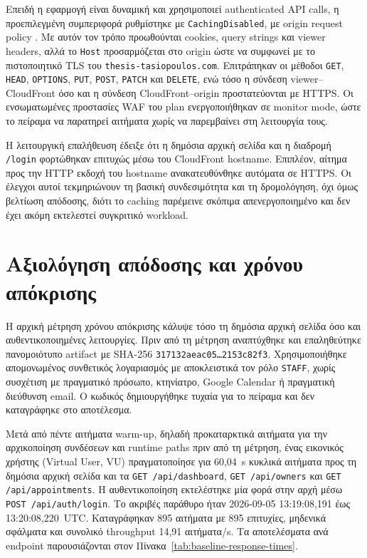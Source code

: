 Επειδή η εφαρμογή είναι δυναμική και χρησιμοποιεί authenticated API calls,
η προεπιλεγμένη συμπεριφορά ρυθμίστηκε με \texttt{CachingDisabled}, με
origin request policy . Με αυτόν τον τρόπο
προωθούνται cookies, query strings και viewer headers, αλλά το \texttt{Host}
προσαρμόζεται στο origin ώστε να συμφωνεί με το πιστοποιητικό TLS του
\texttt{thesis-tasiopoulos.com}. Επιτράπηκαν οι μέθοδοι \texttt{GET},
\texttt{HEAD}, \texttt{OPTIONS}, \texttt{PUT}, \texttt{POST}, \texttt{PATCH}
και \texttt{DELETE}, ενώ τόσο η σύνδεση viewer--CloudFront όσο και η σύνδεση
CloudFront--origin προστατεύονται με HTTPS. Οι ενσωματωμένες προστασίες WAF
του plan ενεργοποιήθηκαν σε monitor mode, ώστε το πείραμα να παρατηρεί
αιτήματα χωρίς να παρεμβαίνει στη λειτουργία τους.

Η λειτουργική επαλήθευση έδειξε ότι η δημόσια αρχική σελίδα και η διαδρομή
\texttt{/login} φορτώθηκαν επιτυχώς μέσω του CloudFront hostname. Επιπλέον,
αίτημα προς την HTTP εκδοχή του hostname ανακατευθύνθηκε αυτόματα σε HTTPS.
Οι έλεγχοι αυτοί τεκμηριώνουν τη βασική συνδεσιμότητα και τη δρομολόγηση, όχι
όμως βελτίωση απόδοσης, διότι το caching παρέμεινε σκόπιμα απενεργοποιημένο
και δεν έχει ακόμη εκτελεστεί συγκριτικό workload.

\section{Αξιολόγηση απόδοσης και χρόνου απόκρισης}
Η αρχική μέτρηση χρόνου απόκρισης κάλυψε τόσο τη δημόσια αρχική σελίδα όσο
και αυθεντικοποιημένες λειτουργίες. Πριν από τη μέτρηση αναπτύχθηκε και
επαληθεύτηκε πανομοιότυπο artifact με SHA-256
\texttt{317132aeac05\ldots 2153c82f3}. Χρησιμοποιήθηκε απομονωμένος
συνθετικός λογαριασμός με αποκλειστικά τον ρόλο \texttt{STAFF}, χωρίς
συσχέτιση με πραγματικό πρόσωπο, κτηνίατρο, Google Calendar ή πραγματική
διεύθυνση email. Ο κωδικός δημιουργήθηκε τυχαία για το πείραμα και δεν
καταγράφηκε στο αποτέλεσμα.

Μετά από πέντε αιτήματα warm-up, δηλαδή προκαταρκτικά αιτήματα για την
αρχικοποίηση συνδέσεων και runtime paths πριν από τη μέτρηση, ένας εικονικός
χρήστης (Virtual User, VU) πραγματοποίησε για
60,04~s κυκλικά αιτήματα προς τη δημόσια αρχική σελίδα και τα
\texttt{GET /api/dashboard}, \texttt{GET /api/owners} και
\texttt{GET /api/appointments}. Η αυθεντικοποίηση εκτελέστηκε μία φορά στην
αρχή μέσω \texttt{POST /api/auth/login}. Το ακριβές παράθυρο ήταν
2026-09-05 13:19:08,191 έως 13:20:08,220~UTC. Καταγράφηκαν 895 αιτήματα με
895 επιτυχίες, μηδενικά σφάλματα και συνολικό throughput 14,91
αιτήματα/s. Τα αποτελέσματα ανά endpoint παρουσιάζονται στον
Πίνακα~\ref{tab:baseline-response-times}.

